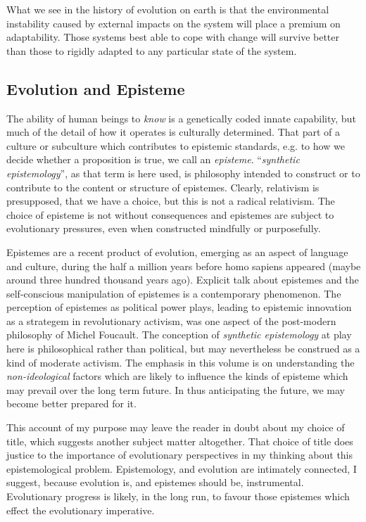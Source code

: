 What we see in the history of evolution on earth is that the environmental instability caused by external impacts on the system will place a premium on adaptability.
Those systems best able to cope with change will survive better than those to rigidly adapted to any particular state of the system.

\subsection{Evolution and Episteme}

The ability of human beings to \emph{know} is a genetically coded innate capability, but much of the detail of how it operates is culturally determined.
That part of a culture or subculture which contributes to epistemic standards, e.g. to how we decide whether a proposition is true, we call an \emph{episteme}.
``\emph{synthetic epistemology}'', as that term is here used, is philosophy intended to construct or to contribute to the content or structure of epistemes.
Clearly, relativism is presupposed, that we have a choice, but this is not a radical relativism.
The choice of episteme is not without consequences and epistemes are subject to evolutionary pressures, even when constructed mindfully or purposefully.

Epistemes are a recent product of evolution, emerging as an aspect of language and culture, during the half a million years before homo sapiens appeared (maybe around three hundred thousand years ago).
Explicit talk about epistemes and the self-conscious manipulation of epistemes is a contemporary phenomenon.
The perception of epistemes as political power plays, leading to epistemic innovation as a strategem in revolutionary activism, was one aspect of the post-modern philosophy of  Michel Foucault.
The conception of \emph{synthetic epistemology} at play here is philosophical rather than political, but may nevertheless be construed as a kind of moderate activism.
The emphasis in this volume is on understanding the \emph{non-ideological} factors which are likely to influence the kinds of episteme which may prevail over the long term future.
In thus anticipating the future, we may become better prepared for it.

This account of my purpose may leave the reader in doubt about my choice of title, which suggests another subject matter altogether.
That choice of title does justice to the importance of evolutionary perspectives in my thinking about this epistemological problem.
Epistemology, and evolution are intimately connected, I suggest, because evolution is, and epistemes should be, instrumental.
Evolutionary progress is likely, in the long run, to favour those epistemes which effect the evolutionary imperative.

